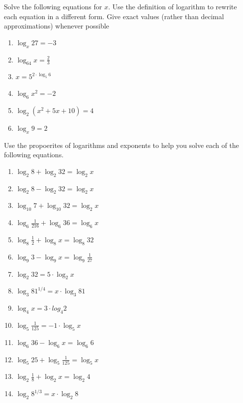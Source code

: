 \documentclass[10pt,]{book}
\theoremstyle{ptxdefinitionnotitle}
\theoremstyle{ptxdefinitiontitle}
\theoremstyle{ptxdefinitionnotitle}
\theoremstyle{ptxdefinitiontitle}
\theoremstyle{ptxdefinitionnotitle}
\theoremstyle{ptxdefinitiontitle}
\numberwithin{equation}{section}
\begin{document}
\begin{divisionexercise}{7}\hypertarget{exercise-81}{}
\hypertarget{p-305}{}%
Solve the following equations for \(x\). Use the definition of logarithm to rewrite each equation in a different form.  Give exact values (rather than decimal approximations) whenever possible%
\leavevmode%
\begin{enumerate}[label=(\alph*)]
\item\hypertarget{li-206}{}\(\log_x 27 = -3\)%
\item\hypertarget{li-207}{}\(\log_{64} x = \frac{2}{3}\)%
\item\hypertarget{li-208}{}\(x = 5^{2 \cdot \log_5 6}\)%
\item\hypertarget{li-209}{}\(\log_6 x^2 = -2\)%
\item\hypertarget{li-210}{}\(\log_2 \left(x^2 + 5x + 10 \right) = 4\)%
\item\hypertarget{li-211}{}\(\log_x 9 = 2\)%
\end{enumerate}
\end{divisionexercise}%
\begin{divisionexercise}{8}\hypertarget{exercise-82}{}
\hypertarget{p-306}{}%
Use the propoerites of logarithms and exponents to help you solve each of the following equations.%
\leavevmode%
\begin{enumerate}[label=(\alph*)]
\item\hypertarget{li-212}{}\(\log_2 8 + \log_2 32 = \log_2 x\)%
\item\hypertarget{li-213}{}\(\log_2 8 - \log_2 32 = \log_2 x\)%
\item\hypertarget{li-214}{}\(\log_{10} 7 + \log_{10} 32 = \log_2 x\)%
\item\hypertarget{li-215}{}\(\log_6 \frac{1}{216} + \log_6 36 = \log_6 x\)%
\item\hypertarget{li-216}{}\(\log_8 \frac{1}{2} + \log_8 x = \log_8 32\)%
\item\hypertarget{li-217}{}\(\log_9 3 - \log_9 x = \log_9 \frac{1}{27}\)%
\item\hypertarget{li-218}{}\(\log_2 32 = 5 \cdot \log_2 x\)%
\item\hypertarget{li-219}{}\(\log_3 81^{1/4} = x \cdot \log_3 81\)%
\item\hypertarget{li-220}{}\(\log_4 x = 3 \cdot log_4 2\)%
\item\hypertarget{li-221}{}\(\log_5 \frac{1}{125} = -1 \cdot \log_5 x\)%
\item\hypertarget{li-222}{}\(\log_6 36 - \log_6 x = \log_6 6\)%
\item\hypertarget{li-223}{}\(\log_5 25 + \log_5 \frac{1}{125} = \log_5 x\)%
\item\hypertarget{li-224}{}\(\log_2 \frac{1}{8} + \log_2 x = \log_2 4\)%
\item\hypertarget{li-225}{}\(\log_2 8 ^ {1/3} = x \cdot \log_2 8\)%
\end{enumerate}
\end{divisionexercise}%
\typeout{************************************************}
\typeout{************************************************}
\end{document}
